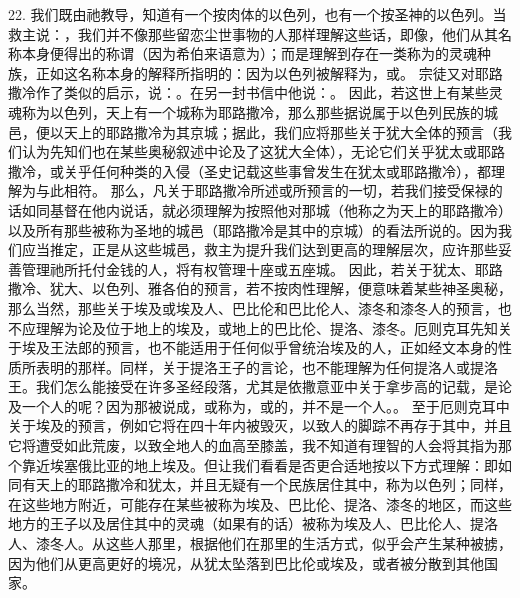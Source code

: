 22. 我们既由祂教导，知道有一个按肉体的以色列，也有一个按圣神的以色列。当救主说：，我们并不像那些留恋尘世事物的人那样理解这些话，即像，他们从其名称本身便得出的称谓（因为希伯来语意为）；而是理解到存在一类称为的灵魂种族，正如这名称本身的解释所指明的：因为以色列被解释为，或。\newline{} 宗徒又对耶路撒冷作了类似的启示，说：。在另一封书信中他说：。\newline{} 因此，若这世上有某些灵魂称为以色列，天上有一个城称为耶路撒冷，那么那些据说属于以色列民族的城邑，便以天上的耶路撒冷为其京城；据此，我们应将那些关于犹大全体的预言（我们认为先知们也在某些奥秘叙述中论及了这犹大全体），无论它们关乎犹太或耶路撒冷，或关乎任何种类的入侵（圣史记载这些事曾发生在犹太或耶路撒冷），都理解为与此相符。\newline{} 那么，凡关于耶路撒冷所述或所预言的一切，若我们接受保禄的话如同基督在他内说话，就必须理解为按照他对那城（他称之为天上的耶路撒冷）以及所有那些被称为圣地的城邑（耶路撒冷是其中的京城）的看法所说的。因为我们应当推定，正是从这些城邑，救主为提升我们达到更高的理解层次，应许那些妥善管理祂所托付金钱的人，将有权管理十座或五座城。\newline{} 因此，若关于犹太、耶路撒冷、犹大、以色列、雅各伯的预言，若不按肉性理解，便意味着某些神圣奥秘，那么当然，那些关于埃及或埃及人、巴比伦和巴比伦人、漆冬和漆冬人的预言，也不应理解为论及位于地上的埃及，或地上的巴比伦、提洛、漆冬。厄则克耳先知关于埃及王法郎的预言，也不能适用于任何似乎曾统治埃及的人，正如经文本身的性质所表明的那样。同样，关于提洛王子的言论，也不能理解为任何提洛人或提洛王。我们怎么能接受在许多圣经段落，尤其是依撒意亚中关于拿步高的记载，是论及一个人的呢？因为那被说成，或称为，或的，并不是一个人。。\newline{} 至于厄则克耳中关于埃及的预言，例如它将在四十年内被毁灭，以致人的脚踪不再存于其中，并且它将遭受如此荒废，以致全地人的血高至膝盖，我不知道有理智的人会将其指为那个靠近埃塞俄比亚的地上埃及。但让我们看看是否更合适地按以下方式理解：即如同有天上的耶路撒冷和犹太，并且无疑有一个民族居住其中，称为以色列；同样，在这些地方附近，可能存在某些被称为埃及、巴比伦、提洛、漆冬的地区，而这些地方的王子以及居住其中的灵魂（如果有的话）被称为埃及人、巴比伦人、提洛人、漆冬人。从这些人那里，根据他们在那里的生活方式，似乎会产生某种被掳，因为他们从更高更好的境况，从犹太坠落到巴比伦或埃及，或者被分散到其他国家。\par

